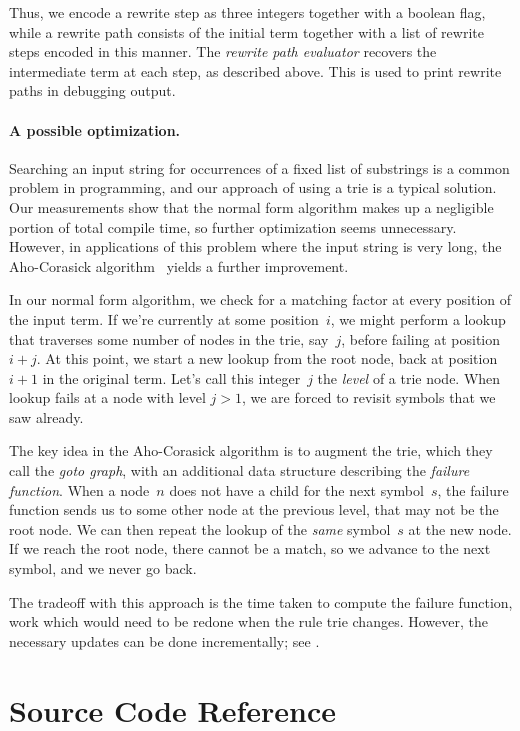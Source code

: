 \documentclass[../generics]{subfiles}
\begin{document}
Thus, we encode a rewrite step as three integers together with a boolean flag, while a rewrite path consists of the initial term together with a list of rewrite steps encoded in this manner. The \emph{rewrite path evaluator} recovers the intermediate term at each step, as described above. This is used to print rewrite paths in debugging output.

\paragraph{A possible optimization.}
Searching an input string for occurrences of a fixed list of substrings is a common problem in programming, and our approach of using a trie is a typical solution. Our measurements show that the normal form algorithm makes up a negligible portion of total compile time, so further optimization seems unnecessary. However, in applications of this problem where the input string is very long, the Aho-Corasick algorithm~\cite{ahocorasick} yields a further improvement.

In our normal form algorithm, we check for a matching factor at every position of the input term. If we're currently at some position~$i$, we might perform a lookup that traverses some number of nodes in the trie, say~$j$, before failing at position $i+j$. At this point, we start a new lookup from the root node, back at position $i+1$ in the original term. Let's call this integer~$j$ the \emph{level} of a trie node. When lookup fails at a node with level $j>1$, we are forced to revisit symbols that we saw already.

The key idea in the Aho-Corasick algorithm is to augment the trie, which they call the \emph{goto graph}, with an additional data structure describing the \emph{failure function}. When a node~$n$ does not have a child for the next symbol~$s$, the failure function sends us to some other node at the previous level, that may not be the root node. We can then repeat the lookup of the \emph{same} symbol~$s$ at the new node. If we reach the root node, there cannot be a match, so we advance to the next symbol, and we never go back.

The tradeoff with this approach is the time taken to compute the failure function, work which would need to be redone when the rule trie changes. However, the necessary updates can be done incrementally; see \cite{MEYER1985219}.

\section{Source Code Reference}\label{src:symbols terms rules}
\end{document}
